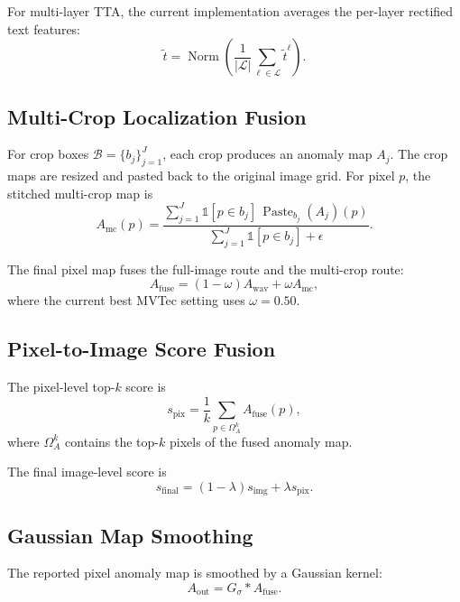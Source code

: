 For multi-layer TTA, the current implementation averages the per-layer
rectified text features:
\begin{equation}
  \tilde{t}
  =
  \operatorname{Norm}
  \left(
    \frac{1}{|\mathcal{L}|}
    \sum_{\ell\in\mathcal{L}} \tilde{t}^{\ell}
  \right).
\end{equation}

\subsection{Multi-Crop Localization Fusion}
\label{subsec:formula_multicrop}

For crop boxes $\mathcal{B}=\{b_j\}_{j=1}^{J}$, each crop produces an anomaly
map $A_j$. The crop maps are resized and pasted back to the original image
grid. For pixel $p$, the stitched multi-crop map is
\begin{equation}
  A_{\mathrm{mc}}(p)
  =
  \frac{
    \sum_{j=1}^{J}
    \mathbb{1}[p\in b_j]\,
    \operatorname{Paste}_{b_j}(A_j)(p)
  }{
    \sum_{j=1}^{J}\mathbb{1}[p\in b_j] + \epsilon
  }.
\end{equation}

The final pixel map fuses the full-image route and the multi-crop route:
\begin{equation}
  A_{\mathrm{fuse}}
  =
  (1-\omega)A_{\mathrm{wav}}
  +
  \omega A_{\mathrm{mc}},
\end{equation}
where the current best MVTec setting uses $\omega=0.50$.

\subsection{Pixel-to-Image Score Fusion}
\label{subsec:formula_pixel_to_image}

The pixel-level top-$k$ score is
\begin{equation}
  s_{\mathrm{pix}}
  =
  \frac{1}{k}
  \sum_{p\in\Omega_{A}^{k}}
  A_{\mathrm{fuse}}(p),
\end{equation}
where $\Omega_A^k$ contains the top-$k$ pixels of the fused anomaly map.

The final image-level score is
\begin{equation}
  s_{\mathrm{final}}
  =
  (1-\lambda)s_{\mathrm{img}}
  +
  \lambda s_{\mathrm{pix}}.
\end{equation}

\subsection{Gaussian Map Smoothing}
\label{subsec:formula_smoothing}

The reported pixel anomaly map is smoothed by a Gaussian kernel:
\begin{equation}
  A_{\mathrm{out}} = G_{\sigma} * A_{\mathrm{fuse}}.
\end{equation}
